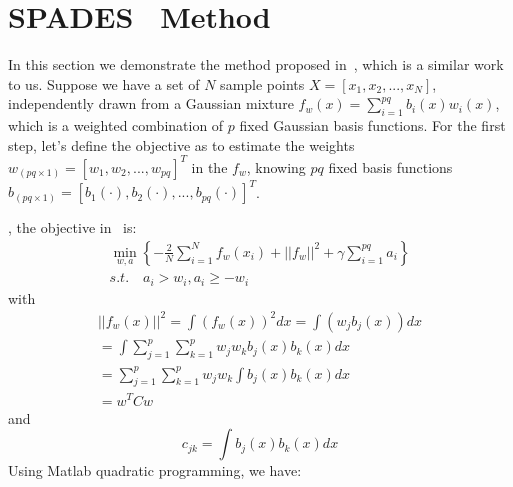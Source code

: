 \section{SPADES~\cite{bunea2010spades} Method}
In this section we demonstrate the method proposed in~\cite{bunea2010spades}, which is a similar work to us. Suppose we have a set of $N$ sample points $X = [x_1, x_2, ..., x_N]$, independently drawn from a Gaussian mixture $f_w(x) = \sum_{i = 1}^{pq} b_i(x)w_i(x)$, which is a weighted combination of $p$ fixed Gaussian basis functions. For the first step, let's define the objective as to estimate the weights $w_{(pq \times 1)} = [w_1, w_2, ..., w_{pq}]^T$ in the $f_w$, knowing $pq$ fixed basis functions $b_{(pq\times 1)} = [b_1(\cdot), b_2(\cdot), ..., b_{pq}(\cdot)]^T$.\par, the objective in~\cite{bunea2010spades} is:
\begin{equation}
\begin{aligned}
    \min_{w, a} \left\{ -\frac{2}{N} \sum_{i=1}^N f_w(x_i) + ||f_w||^2 + \gamma\sum_{i=1}^{pq} a_i \right\}\\
    s. t. \quad a_i > w_i, a_i \geq -w_i
\end{aligned}   
\end{equation}
with
\begin{equation}
\begin{split}
||f_w(x)||^2 = \int (f_w(x))^2 dx = \int (w_jb_j(x))dx \\
= \int \sum_{j=1}^p \sum_{k=1}^p w_j w_kb_j(x) b_k(x)dx \\
= \sum_{j=1}^p \sum_{k=1}^p w_j w_k \int b_j(x) b_k(x) dx \\
= w^TCw
\end{split}
\end{equation}
and
\begin{equation}
c_{jk} = \int b_j(x) b_k(x) dx
\end{equation}
Using Matlab quadratic programming, we have:
